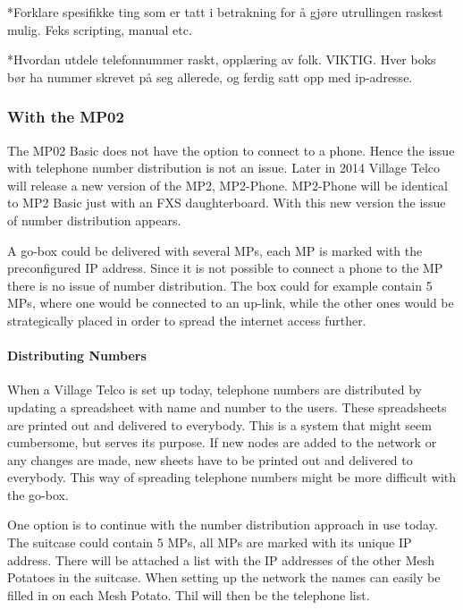 *Forklare spesifikke ting som er tatt i betrakning for å gjøre utrullingen raskest mulig. Feks scripting, manual etc. 

*Hvordan utdele telefonnummer raskt, opplæring av folk. VIKTIG. Hver boks bør ha nummer skrevet på seg allerede, og ferdig satt opp med ip-adresse. 

\subsubsection{With the MP02}
The MP02 Basic does not have the option to connect to a phone. Hence the issue with telephone number distribution is not an issue. Later in 2014 Village Telco will release a new version of the MP2, MP2-Phone. MP2-Phone will be identical to MP2 Basic just with an FXS daughterboard. With this new version the issue of number distribution appears. 

A go-box could be delivered with several MPs, each MP is marked with the preconfigured IP address. Since it is not possible to connect a phone to the MP there is no issue of number distribution. The box could for example contain 5 MPs, where one would be connected to an up-link, while the other ones would be strategically placed in order to spread the internet access further. 

\paragraph{Distributing Numbers}
When a Village Telco is set up today, telephone numbers are distributed by updating a spreadsheet with name and number to the users. These spreadsheets are printed out and delivered to everybody. This is a system that might seem cumbersome, but serves its purpose. If new nodes are added to the network or any changes are made, new sheets have to be printed out and delivered to everybody. This way of spreading telephone numbers might be more difficult with the go-box. 

One option is to continue with the number distribution approach in use today. The suitcase could contain 5 MPs, all MPs are marked with its unique IP address. There will be attached a list with the IP addresses of the other Mesh Potatoes in the suitcase. When setting up the network the names can easily be filled in on each Mesh Potato. Thil will then be the telephone list.  

